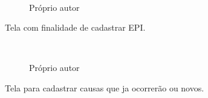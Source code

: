 \begin{figure}[H]
		\caption{\label{Cadastro_Componentes}Próprio autor}
	\centering
	\mbox{%
		\qquad
	}
	
\end{figure}
\newpage

Tela com finalidade de cadastrar EPI.

\begin{figure}[H]
		\caption{\label{Cadastro_Epi_Sistema}Próprio autor}
	\centering
	\mbox{%
		\qquad
	}
	
\end{figure}
\newpage

Tela para cadastrar causas que ja ocorrerão ou novos.

